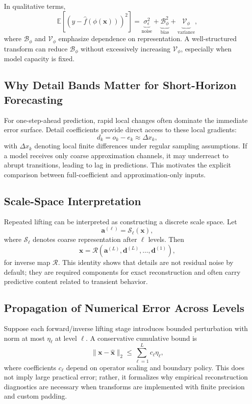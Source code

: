 \documentclass[journal]{IEEEtran}
\begin{document}
In qualitative terms,
\begin{equation}
\mathbb{E}\left[(y-\hat{f}(\phi(\mathbf{x})))^2\right]
=\underbrace{\sigma_\epsilon^2}_{\text{noise}}+\underbrace{\mathcal{B}_{\phi}^2}_{\text{bias}}+\underbrace{\mathcal{V}_{\phi}}_{\text{variance}},
\end{equation}
where $\mathcal{B}_{\phi}$ and $\mathcal{V}_{\phi}$ emphasize dependence on representation. A well-structured transform can reduce $\mathcal{B}_{\phi}$ without excessively increasing $\mathcal{V}_{\phi}$, especially when model capacity is fixed.

\subsection{Why Detail Bands Matter for Short-Horizon Forecasting}
For one-step-ahead prediction, rapid local changes often dominate the immediate error surface. Detail coefficients provide direct access to these local gradients:
\begin{equation}
d_k=o_k-e_k \approx \Delta x_k,
\end{equation}
with $\Delta x_k$ denoting local finite differences under regular sampling assumptions. If a model receives only coarse approximation channels, it may underreact to abrupt transitions, leading to lag in predictions. This motivates the explicit comparison between full-coefficient and approximation-only inputs.

\subsection{Scale-Space Interpretation}
Repeated lifting can be interpreted as constructing a discrete scale space. Let
\begin{equation}
\mathbf{a}^{(\ell)}=\mathcal{S}_{\ell}(\mathbf{x}),
\end{equation}
where $\mathcal{S}_{\ell}$ denotes coarse representation after $\ell$ levels. Then
\begin{equation}
\mathbf{x}=\mathcal{R}\left(\mathbf{a}^{(L)},\mathbf{d}^{(L)},\ldots,\mathbf{d}^{(1)}\right),
\end{equation}
for inverse map $\mathcal{R}$. This identity shows that details are not residual noise by default; they are required components for exact reconstruction and often carry predictive content related to transient behavior.

\subsection{Propagation of Numerical Error Across Levels}
Suppose each forward/inverse lifting stage introduces bounded perturbation with norm at most $\eta_\ell$ at level $\ell$. A conservative cumulative bound is
\begin{equation}
\|\mathbf{x}-\hat{\mathbf{x}}\|_2 \leq \sum_{\ell=1}^{L} c_\ell\eta_\ell,
\end{equation}
where coefficients $c_\ell$ depend on operator scaling and boundary policy. This does not imply large practical error; rather, it formalizes why empirical reconstruction diagnostics are necessary when transforms are implemented with finite precision and custom padding.
\end{document}
